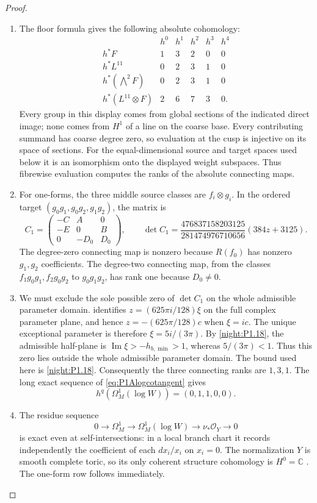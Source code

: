 \begin{proof}
\begin{enumerate}[label={$\langle1\rangle$\arabic*.}]
\item The floor formula gives the following absolute cohomology:
\[
\begin{array}{c|ccccc}
&h^0&h^1&h^2&h^3&h^4\\\hline
h^*F&1&3&2&0&0\\
h^*L^{11}&0&2&3&1&0\\
h^*(\bigwedge^2F)&0&2&3&1&0\\
h^*(L^{11}\otimes F)&2&6&7&3&0.
\end{array}
\]
Every group in this display comes from global sections of the
indicated direct image; none comes from $H^1$ of a line on the
coarse base. Every contributing summand has coarse degree zero,
so evaluation at the cusp is injective on its space of sections.
For the equal-dimensional source and target spaces used below
it is an isomorphism onto the displayed weight subspaces.
Thus fibrewise evaluation computes the ranks of the
absolute connecting maps.

\item For one-forms, the three middle source classes are $f_i\otimes g_i$.
In the ordered target $(g_0g_1,g_0g_2,g_1g_2)$, the matrix is
\[
C_1=\begin{pmatrix}-C&A&0\\-E&0&B\\0&-D_0&D_0\end{pmatrix},
\qquad
\det C_1=
\frac{476837158203125}{281474976710656}(384z+3125).
\]
The degree-zero connecting map is nonzero because $R(f_0)$
has nonzero $g_1,g_2$ coefficients. The degree-two connecting
map, from the classes $f_1g_0g_1,f_2g_0g_2$ to $g_0g_1g_2$,
has rank one because $D_0\ne0$.

\item We must exclude the sole possible zero of $\det C_1$ on the
whole admissible parameter domain.  identifies $z=(625\pi i/128)\xi$ on the full complex
parameter plane, and hence $z=-(625\pi/128)c$ when $\xi=ic$.
The unique exceptional parameter is therefore
$\xi=5i/(3\pi)$. By \cref{night:P1.18}, the admissible half-plane is
$\operatorname{Im}\xi>-h_{b,\min}>1$, whereas $5/(3\pi)<1$.
Thus this zero lies outside the whole admissible parameter domain.
The bound used here is
\cref{night:P1.18}.
Consequently the three connecting ranks are $1,3,1$.
The long exact sequence of \eqref{eq:P1Alogcotangent} gives
\[
h^q(\Omega_M^1(\log W))=(0,1,1,0,0).
\]

\item The residue sequence
\[
0\to\Omega_M^1\to\Omega_M^1(\log W)\to\nu_*\mathcal O_Y\to0
\]
is exact even at self-intersections: in a local branch chart it
records independently the coefficient of each $dx_i/x_i$ on
$x_i=0$. The normalization $Y$ is smooth complete toric, so its
only coherent structure cohomology is $H^0=\mathbb C$ \cite[Theorem 9.2.3, p.~410]{CoxLittleSchenck2011}.
The one-form row follows immediately.


\end{enumerate}
\end{proof}
